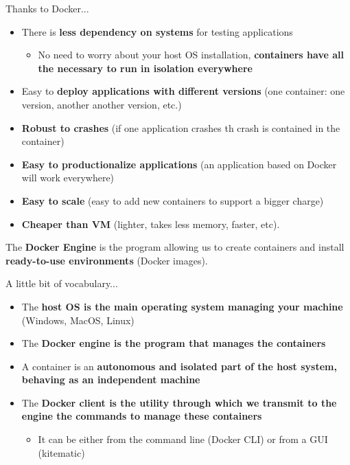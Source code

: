 \documentclass[handout]{beamer}[10pt, usepdftitle=false]
\begin{document}
	
	\begin{frame}
	
	Thanks to Docker...
	\vspace*{0.6em}
	
	\begin{itemize}
		\item{There is \textbf{less dependency on systems} for testing applications 
			\begin{itemize}
				\item{No need to worry about your host OS installation, \textbf{containers have all the necessary to run in isolation everywhere}}				
			\end{itemize}					
		}	
		\item{Easy to \textbf{deploy applications with different versions} (one container: one version, another another version, etc.)}
		\item{\textbf{Robust to crashes} (if one application crashes th crash is contained in the container)}	
		\item{\textbf{Easy to productionalize applications} (an application based on Docker will work everywhere)}
		\item{\textbf{Easy to scale} (easy to add new containers to support a bigger charge)}
		\item{\textbf{Cheaper than VM} (lighter, takes less memory, faster, etc).}		
	\end{itemize}

	\end{frame}	
	
	\begin{frame}
	
	The \textbf{Docker Engine} is the program allowing us to create containers and install \textbf{ready-to-use environments} (Docker images). 
	\vspace*{0.6em}
	
	A little bit of vocabulary...
	\vspace*{0.6em}
	
    \begin{itemize}
	\item{The \textbf{host OS is the main operating system managing your machine} (Windows, MacOS, Linux)}  
	\item{The \textbf{Docker engine is the program that manages the containers}}   
	\item{A container is an \textbf{autonomous and isolated part of the host system, behaving as an independent machine}}
	\item{The \textbf{Docker client is the utility through which we transmit to the engine the commands to manage these containers}
		\begin{itemize}
			\item{It can be either from the command line (Docker CLI) or from a GUI (kitematic)}
		\end{itemize}			
	}   
    
    \end{itemize}  
	\end{frame}
	
\end{document}
